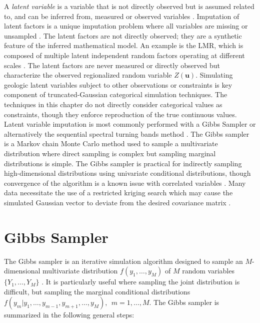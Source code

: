 A \textit{latent variable} is a variable that is not directly observed but is assumed related to, and can be inferred from, measured or observed variables \citep{everitt2010cambridge}. Imputation of latent factors is a unique imputation problem where all variables are missing or unsampled \citep{little2019statistical}. The latent factors are not directly observed; they are a synthetic feature of the inferred mathematical model. An example is the \gls{LMR}, which is composed of multiple latent independent random factors operating at different scales \citep{goovaerts1992factorial}. The latent factors are never measured or directly observed but characterize the observed regionalized random variable $Z(\mathbf{u})$. Simulating geologic latent variables subject to other observations or constraints is key component of truncated-Gaussian categorical simulation techniques. The techniques in this chapter do not directly consider categorical values as constraints, though they enforce reproduction of the true continuous values. Latent variable imputation is most commonly performed with a Gibbs Sampler \citep{emery2014simulating,silva2017multiple,arroyo2020iterative,madani2021enhanced} or alternatively the sequential spectral turning bands method \citep{lauzon2020calibration,lauzon2020sequential,lauzon2023joint}. The Gibbs sampler is a Markov chain Monte Carlo method used to sample a multivariate distribution where direct sampling is complex but sampling marginal distributions is simple. The Gibbs sampler is practical for indirectly sampling high-dimensional distributions using univariate conditional distributions, though convergence of the algorithm is a known issue with correlated variables \citep{silva2018enhanced}. Many data necessitate the use of a restricted kriging search which may cause the simulated Gaussian vector to deviate from the desired covariance matrix \citep{emery2014simulating}.


\FloatBarrier
\section{Gibbs Sampler}
\label{sec:gibbs}

The Gibbs sampler \citep{geman1984stochastic} is an iterative simulation algorithm designed to sample an $M$-dimensional multivariate distribution $f(y_{1}, \dots, y_{M})$ of $M$ random variables $\{Y_{1}, \dots, Y_{M}\}$ \citep{little2019statistical}. It is particularly useful where sampling the joint distribution is difficult, but sampling the marginal conditional distributions $f(y_{m}|y_{1},\dots,y_{m-1},y_{m+1},\dots,y_{M}), \ \ m=1,\dots,M$. The Gibbs sampler is summarized in the following general steps:

